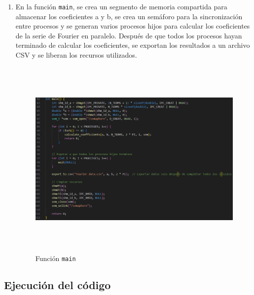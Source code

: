\begin{enumerate}
	\item En la función \texttt{main}, se crea un segmento de memoria compartida para almacenar los coeficientes a y b, se crea un semáforo para la sincronización entre procesos y se generan varios procesos hijos para calcular los coeficientes de la serie de Fourier en paralelo. Después de que todos los procesos hayan terminado de calcular los coeficientes, se exportan los resultados a un archivo CSV y se liberan los recursos utilizados.
	
	\begin{figure}[H]
		\centering
		\includegraphics[width=6.26772in,height=3.90278in]{media/image7.png}
		\caption{Función \texttt{main}}
	\end{figure}
	
\end{enumerate}

\subsection{Ejecución del código}


